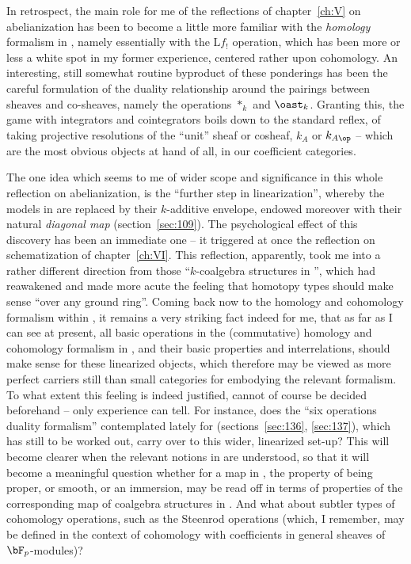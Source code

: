 In retrospect, the main role for me of the reflections of
chapter~\ref{ch:V} on abelianization has been to become a little more
familiar with the \emph{homology} formalism in \Cat, namely
essentially with the $\mathrm Lf_!$ operation, which has been more or
less a white spot in my former experience, centered rather upon
cohomology. An interesting, still somewhat routine byproduct of these
ponderings has been the careful formulation of the duality
relationship around the pairings between sheaves and co-sheaves,
namely the operations $*_k$ and $\oast_k$. Granting this, the game
with integrators and cointegrators boils down to the standard reflex,
of taking projective resolutions of the ``unit'' sheaf or cosheaf,
$k_A$ or $k_{A\op}$ -- which are the most obvious objects at hand of
all, in our coefficient categories.

The one idea which seems to me of wider scope and significance in this
whole reflection on abelianization, is the ``further step in
linearization'', whereby the models in \Cat{} are replaced by their
$k$-additive envelope, endowed moreover with their natural
\emph{diagonal map} (section~\ref{sec:109}). The psychological effect
of this discovery has been an immediate one -- it triggered at once
the reflection on schematization of chapter~\ref{ch:VI}. This
reflection, apparently, took me into a rather different direction from
those ``$k$-coalgebra structures in \Cat'', which had reawakened and
made more acute the feeling that homotopy types should make sense
``over any ground ring''. Coming back now to the homology and
cohomology formalism within \Cat, it remains a very
striking fact indeed for me, that as far as I can see at present, all
basic operations in the (commutative) homology and cohomology
formalism in \Cat, and their basic properties and interrelations,
should make sense for these linearized objects, which therefore may be
viewed as more perfect carriers still than small categories for
embodying the relevant formalism. To what extent this feeling is
indeed justified, cannot of course be decided beforehand -- only
experience can tell. For instance, does the ``six operations duality
formalism'' contemplated lately for \Cat{} (sections~\ref{sec:136},
\ref{sec:137}), which has still to be worked out, carry over to this
wider, linearized set-up? This will become clearer when the relevant
notions in \Cat{} are understood, so that it will become a meaningful
question whether for a map in \Cat, the property of being proper, or
smooth, or an immersion, may be read off in terms of properties of the
corresponding map of coalgebra structures in \Cat. And what about
subtler types of cohomology operations, such as the Steenrod
operations (which, I remember, may be defined in the context of
cohomology with coefficients in general sheaves of $\bF_p$-modules)?

